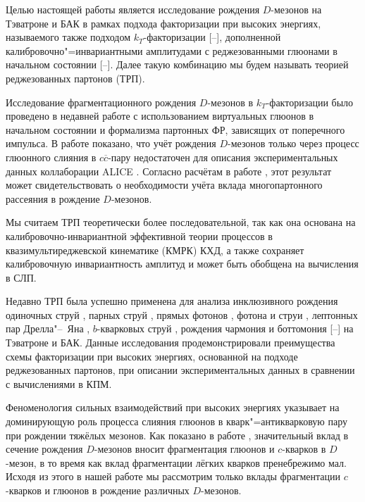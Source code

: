 Целью настоящей работы является исследование рождения $D$-мезонов на Тэватроне и БАК в рамках подхода факторизации при высоких энергиях, называемого также подходом $k_{T}$-факторизации [--], дополненной калибровочно"=инвариантными амплитудами с реджезованными глюонами в начальном состоянии [--]. Далее такую комбинацию мы будем называть теорией реджезованных партонов (ТРП).



Исследование фрагментационного рождения $D$-мезонов в $k_{T}$-факториза\-ции было проведено в недавней работе \cite{newKT} с использованием виртуальных глюонов в начальном состоянии и формализма партонных ФР, зависящих от поперечного импульса. В работе \cite{newKT} показано, что учёт рождения $D$-мезонов только через процесс глюонного слияния в $c\overline{c}$-пару недостаточен для описания экспериментальных данных коллаборации ALICE \cite{ALICE7}. Согласно расчётам в работе \cite{newKT}, этот результат может свидетельствовать о необходимости учёта вклада многопартонного рассеяния в рождение $D$-мезонов.



Мы считаем ТРП теоретически более последовательной, так как она основана на калибровочно-инвариантной эффективной теории процессов в квазимультиреджевской кинематике (КМРК) КХД, а также сохраняет калибровочную инвариантность амплитуд и может быть обобщена на вычисления в СЛП.

Недавно ТРП была успешно применена для анализа инклюзивного рождения одиночных струй \cite{KSSY}, парных струй \cite{NSSjets}, прямых фотонов \cite{tevatronY,heraY}, фотона и струи \cite{KNS14}, лептонных пар Дрелла"--~Яна \cite{NNS_DY}, $b$-кварковых струй \cite{bbTEV,bbLHC}, рождения чармония и боттомония [--] на Тэватроне и БАК. Данные исследования продемонстрировали преимущества схемы факторизации при высоких энергиях, основанной на подходе реджезованных партонов, при описании экспериментальных данных в сравнении с вычислениями в КПМ.



\smallskip




Феноменология сильных взаимодействий при высоких энергиях указывает на доминирующую роль процесса слияния глюонов в кварк"=антикварковую пару при рождении тяжёлых мезонов. Как показано в работе \cite{KKSS}, значительный вклад в сечение рождения $D$-мезонов вносит фрагментация глюонов и $c$-кварков в $D$-мезон, в то время как вклад фрагментации лёгких кварков пренебрежимо мал. Исходя из этого в нашей работе мы рассмотрим только вклады фрагментации $c$-кварков и глюонов в рождение различных $D$-мезонов.







